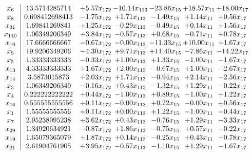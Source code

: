 \documentclass[8pt]{article}
\begin{document}
\[\begin{array}{c| c c@{\hskip 2pt} c@{\hskip 2pt} c@{\hskip 2pt} c@{\hskip 2pt} c@{\hskip 2pt} }
 x_{6}   &  13.5714285714 & +  5.57 x_{172} & -10.14 x_{113} & -23.86 x_{15} & + 18.57 x_{11} & + 18.00 x_{17}\\
 x_{8}   &  0.698412698413 & -1.75 x_{172} & +  1.71 x_{113} & -1.49 x_{15} & +  1.14 x_{11} & +  0.56 x_{17}\\
 x_{31}   &  1.69841269841 & +  1.25 x_{172} & -0.29 x_{113} & -0.49 x_{15} & +  0.14 x_{11} & +  1.56 x_{17}\\
 x_{140}   &  1.06349206349 & +  3.84 x_{172} & -0.57 x_{113} & +  0.68 x_{15} & -0.71 x_{11} & +  0.78 x_{17}\\
 x_{10}   &  17.6666666667 & -0.67 x_{172} & -0.00 x_{113} & -11.33 x_{15} & + 10.00 x_{11} & +  1.67 x_{17}\\
 x_{9}   &  19.9206349206 & -4.30 x_{172} & +  9.71 x_{113} & + 11.40 x_{15} & -7.86 x_{11} & -14.22 x_{17}\\
 x_{5}   &  1.33333333333 & -0.33 x_{172} & +  1.00 x_{113} & +  1.33 x_{15} & -1.00 x_{11} & -1.67 x_{17}\\
 x_{13}   &  4.33333333333 & +  1.67 x_{172} & +  2.00 x_{113} & -0.67 x_{15} & +  1.00 x_{11} & -2.67 x_{17}\\
 x_{14}   &  3.5873015873 & +  2.03 x_{172} & +  1.71 x_{113} & -0.94 x_{15} & +  2.14 x_{11} & -2.56 x_{17}\\
 x_{3}   &  1.06349206349 & -0.16 x_{172} & +  0.43 x_{113} & -1.32 x_{15} & +  1.29 x_{11} & -0.22 x_{17}\\
 x_{4}   &  0.222222222222 & +  0.44 x_{172} & -1.00 x_{113} & +  0.89 x_{15} & -1.00 x_{11} & +  1.22 x_{17}\\
 x_{16}   &  0.555555555556 & +  0.11 x_{172} & -0.00 x_{113} & +  0.22 x_{15} & -0.00 x_{11} & +  0.56 x_{17}\\
 x_{1}   &  1.55555555556 & +  0.11 x_{172} & +  0.00 x_{113} & +  1.22 x_{15} & -1.00 x_{11} & -0.44 x_{17}\\
 x_{7}   &  2.95238095238 & +  3.62 x_{172} & +  0.43 x_{113} & -0.76 x_{15} & +  1.29 x_{11} & -3.33 x_{17}\\
 x_{29}   &  1.34920634921 & -0.87 x_{172} & +  1.86 x_{113} & -0.75 x_{15} & +  0.57 x_{11} & -0.22 x_{17}\\
 x_{19}   &  1.65079365079 & +  1.87 x_{172} & +  0.14 x_{113} & -0.25 x_{15} & +  0.43 x_{11} & -0.78 x_{17}\\
 x_{21}   &  2.61904761905 & +  3.95 x_{172} & -0.57 x_{113} & -1.10 x_{15} & +  1.29 x_{11} & -1.67 x_{17}\\

\end{array}\]
\end{document}

